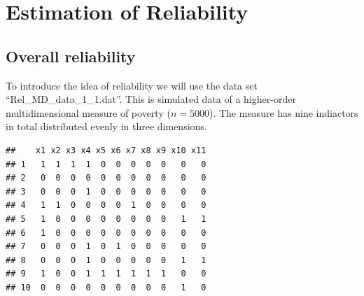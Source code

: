 \documentclass[]{book}
\newenvironment{Shaded}{\begin{snugshade}}{\end{snugshade}}
\newcommand{\DecValTok}[1]{\textcolor[rgb]{0.00,0.00,0.81}{#1}}
\newcommand{\KeywordTok}[1]{\textcolor[rgb]{0.13,0.29,0.53}{\textbf{#1}}}
\newcommand{\NormalTok}[1]{#1}
\newcommand{\OperatorTok}[1]{\textcolor[rgb]{0.81,0.36,0.00}{\textbf{#1}}}
\newcommand{\StringTok}[1]{\textcolor[rgb]{0.31,0.60,0.02}{#1}}
\begin{document}
\hypertarget{estimation-of-reliability}{%
\section{Estimation of Reliability}\label{estimation-of-reliability}}

\hypertarget{overall-reliability}{%
\subsection{Overall reliability}\label{overall-reliability}}

To introduce the idea of reliability we will use the data set ``Rel\_MD\_data\_1\_1.dat''. This is simulated data of a higher-order multidimensional measure of poverty (\(n=5000\)). The measure has nine indiactors in total distributed evenly in three dimensions.

\begin{Shaded}
\end{Shaded}

\begin{verbatim}
##    x1 x2 x3 x4 x5 x6 x7 x8 x9 x10 x11
## 1   1  1  1  1  0  0  0  0  0   0   0
## 2   0  0  0  0  0  0  0  0  0   0   0
## 3   0  0  0  1  0  0  0  0  0   0   0
## 4   1  1  0  0  0  0  1  0  0   0   0
## 5   1  0  0  0  0  0  0  0  0   1   1
## 6   1  0  0  0  0  0  0  0  0   0   0
## 7   0  0  0  1  0  1  0  0  0   0   0
## 8   0  0  0  1  0  0  0  0  0   1   1
## 9   1  0  0  1  1  1  1  1  1   0   0
## 10  0  0  0  0  0  0  0  0  0   1   0
\end{verbatim}
\end{document}
